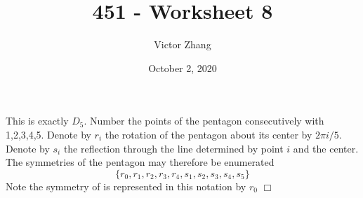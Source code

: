\documentclass{article}
\title{451 - Worksheet 8}
\author{Victor Zhang}
\date{October 2, 2020}
\begin{document}
\maketitle

\section{}
This is exactly $D_5$. Number the points of the pentagon consecutively with 1,2,3,4,5. Denote by $r_i$ the rotation of the pentagon about its center by $2\pi i/5$. Denote by $s_i$ the reflection through the line determined by point $i$ and the center. The symmetries of the pentagon may therefore be enumerated
$$\{r_0, r_1, r_2, r_3, r_4, s_1, s_2, s_3, s_4, s_5\}$$
Note the symmetry of  is represented in this notation by $r_0$ $\Box$
\end{document}
